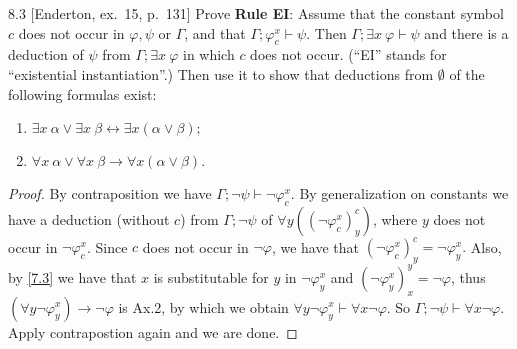 \begin{exercise}{8.3}
  [Enderton, ex.~15, p.~131] Prove \textbf{Rule EI}: Assume that the constant symbol $c$ does not occur in $\varphi,\psi$ or $\Gamma$, and that $\Gamma;\varphi_c^x\vdash \psi$. Then $\Gamma;\exists x\ \varphi\vdash \psi$ and there is a deduction of $\psi$ from $\Gamma;\exists x\ \varphi$ in which $c$ does not occur. (``EI'' stands for ``existential instantiation''.) Then use it to show that deductions from $\emptyset$ of the following formulas exist:
  \begin{enumerate}
    \item $\exists x\ \alpha\vee\exists x\ \beta \leftrightarrow \exists x(\alpha\vee \beta);$
    \item $\forall x\ \alpha\vee\forall x\ \beta \rightarrow \forall x(\alpha\vee \beta).$\qedhere
  \end{enumerate}
\end{exercise}

\begin{proof}
  By contraposition we have $\Gamma;\neg \psi\vdash\neg \varphi_c^x$. By generalization on constants we have a deduction (without $c$) from $\Gamma;\neg \psi$ of $\forall y((\neg \varphi_c^x)_y^c)$, where $y$ does not occur in $\neg\varphi_c^x$. Since $c$ does not occur in $\neg\varphi$, we have that $(\neg\varphi_c^x)_y^c=\neg\varphi_y^x.$ Also, by \ref{7.3} we have that $x$ is substitutable for $y$ in $\neg \varphi_y^x$ and $(\neg \varphi_y^x)_x^y=\neg \varphi$, thus $(\forall y \neg\varphi_y^x)\to \neg\varphi$ is Ax.2, by which we obtain $\forall y\neg \varphi_y^x\vdash\forall x\neg \varphi$. So $\Gamma;\neg \psi\vdash\forall x\neg \varphi.$ Apply contrapostion again and we are done.
\end{proof}

